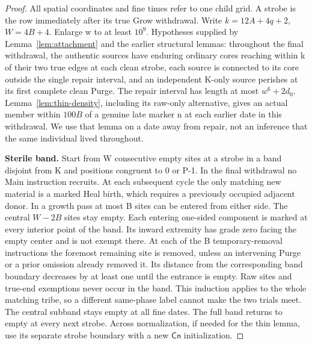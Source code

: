 \begin{proof}
All spatial coordinates and fine times refer to one child grid. A strobe is the row immediately after its true Grow withdrawal. Write \(k=12A+4q+2\), \(W=4B+4\). Enlarge w to at least \(10^9\). Hypotheses supplied by Lemma~\ref{lem:attachment} and the earlier structural lemmas: throughout the final withdrawal, the authentic sources have enduring ordinary cores reaching within k of their two true edges at each clean strobe, each source is connected to its core outside the single repair interval, and an independent K-only source perishes at its first complete clean Purge. The repair interval has length at most \(w^6+2d_0\). Lemma~\ref{lem:thin-density}, including its raw-only alternative, gives an actual member within \(100B\) of a genuine late marker n at each earlier date in this withdrawal. We use that lemma on a date away from repair, not an inference that the same individual lived throughout.



\textbf{Sterile band.} Start from W consecutive empty sites at a strobe in a band disjoint from K and positions congruent to 0 or P-1. In the final withdrawal no Main instruction recruits. At each subsequent cycle the only matching new material is a marked Heal birth, which requires a previously occupied adjacent donor. In a growth pass at most B sites can be entered from either side. The central \(W-2B\) sites stay empty. Each entering one-sided component is marked at every interior point of the band. Its inward extremity has grade zero facing the empty center and is not exempt there. At each of the B temporary-removal instructions the foremost remaining site is removed, unless an intervening Purge or a prior omission already removed it. Its distance from the corresponding band boundary decreases by at least one until the entrance is empty. Raw sites and true-end exemptions never occur in the band. This induction applies to the whole matching tribe, so a different same-phase label cannot make the two trials meet. The central subband stays empty at all fine dates. The full band returns to empty at every next strobe. Across normalization, if needed for the thin lemma, use its separate strobe boundary with a new \(\mathsf{Cn}\) initialization.


\end{proof}
